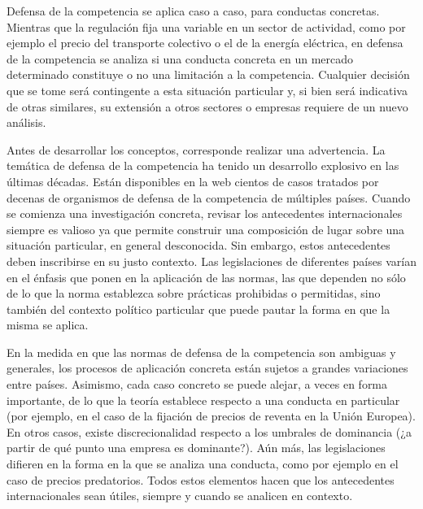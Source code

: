 \documentclass[
  12pt,
  spanish,
]{book}
\begin{document}
Defensa de la competencia se aplica caso a caso, para conductas concretas. Mientras que la regulación fija una variable en un sector de actividad, como por ejemplo el precio del transporte colectivo o el de la energía eléctrica, en defensa de la competencia se analiza si una conducta concreta en un mercado determinado constituye o no una limitación a la competencia. Cualquier decisión que se tome será contingente a esta situación particular y, si bien será indicativa de otras similares, su extensión a otros sectores o empresas requiere de un nuevo análisis.

Antes de desarrollar los conceptos, corresponde realizar una advertencia. La temática de defensa de la competencia ha tenido un desarrollo explosivo en las últimas décadas. Están disponibles en la web cientos de casos tratados por decenas de organismos de defensa de la competencia de múltiples países. Cuando se comienza una investigación concreta, revisar los antecedentes internacionales siempre es valioso ya que permite construir una composición de lugar sobre una situación particular, en general desconocida. Sin embargo, estos antecedentes deben inscribirse en su justo contexto. Las legislaciones de diferentes países varían en el énfasis que ponen en la aplicación de las normas, las que dependen no sólo de lo que la norma establezca sobre prácticas prohibidas o permitidas, sino también del contexto político particular que puede pautar la forma en que la misma se aplica.

En la medida en que las normas de defensa de la competencia son ambiguas y generales, los procesos de aplicación concreta están sujetos a grandes variaciones entre países. Asimismo, cada caso concreto se puede alejar, a veces en forma importante, de lo que la teoría establece respecto a una conducta en particular (por ejemplo, en el caso de la fijación de precios de reventa en la Unión Europea). En otros casos, existe discrecionalidad respecto a los umbrales de dominancia (¿a partir de qué punto una empresa es dominante?). Aún más, las legislaciones difieren en la forma en la que se analiza una conducta, como por ejemplo en el caso de precios predatorios. Todos estos elementos hacen que los antecedentes internacionales sean útiles, siempre y cuando se analicen en contexto.
\end{document}
